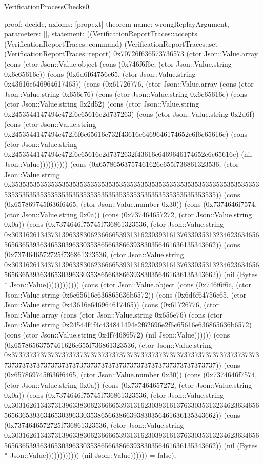 \begin{lexlean}{VerificationProcessChecks0}
\begin{semanticmodule}
{  proof: decide{},
  axioms: [propext]
}
theorem{
  name: wrongReplayArgument,
  parameters: [],
  statement: ((VerificationReportTraces::accepts (VerificationReportTraces::command) (VerificationReportTraces::set (VerificationReportTraces::report) 0x70726f636573736573 (ctor Json::Value.array (cons (ctor Json::Value.object (cons (0x746f6f6c, (ctor Json::Value.string 0x6c65616e)) (cons (0x6d6f64756c65, (ctor Json::Value.string 0x43616e646964617465)) (cons (0x61726776, (ctor Json::Value.array (cons (ctor Json::Value.string 0x656e76) (cons (ctor Json::Value.string 0x6c65616e) (cons (ctor Json::Value.string 0x2d52) (cons (ctor Json::Value.string 0x2453544147494e472f6c65616e2d737263) (cons (ctor Json::Value.string 0x2d6f) (cons (ctor Json::Value.string 0x2453544147494e472f6f6c65616e732f43616e6469646174652e6f6c65616e) (cons (ctor Json::Value.string 0x2453544147494e472f6c65616e2d7372632f43616e6469646174652e6c65616e) (nil Json::Value)))))))))) (cons (0x65786563757461626c655f736861323536, (ctor Json::Value.string 0x35353535353535353535353535353535353535353535353535353535353535353535353535353535353535353535353535353535353535353535353535353535)) (cons (0x657869745f636f6465, (ctor Json::Value.number 0x30)) (cons (0x7374646f7574, (ctor Json::Value.string 0x0a)) (cons (0x737464657272, (ctor Json::Value.string 0x0a)) (cons (0x7374646f75745f736861323536, (ctor Json::Value.string 0x30316261343731396338306236666539313162303931613763303531323462363465656563653936346530396330353865663866393830356461636135343662)) (cons (0x7374646572725f736861323536, (ctor Json::Value.string 0x30316261343731396338306236666539313162303931613763303531323462363465656563653936346530396330353865663866393830356461636135343662)) (nil (Bytes * Json::Value)))))))))))) (cons (ctor Json::Value.object (cons (0x746f6f6c, (ctor Json::Value.string 0x6c65616e636865636b6572)) (cons (0x6d6f64756c65, (ctor Json::Value.string 0x43616e646964617465)) (cons (0x61726776, (ctor Json::Value.array (cons (ctor Json::Value.string 0x656e76) (cons (ctor Json::Value.string 0x24544f4f4c434841494e2f62696e2f6c65616e636865636b6572) (cons (ctor Json::Value.string 0x4f74686572) (nil Json::Value)))))) (cons (0x65786563757461626c655f736861323536, (ctor Json::Value.string 0x37373737373737373737373737373737373737373737373737373737373737373737373737373737373737373737373737373737373737373737373737373737)) (cons (0x657869745f636f6465, (ctor Json::Value.number 0x30)) (cons (0x7374646f7574, (ctor Json::Value.string 0x0a)) (cons (0x737464657272, (ctor Json::Value.string 0x0a)) (cons (0x7374646f75745f736861323536, (ctor Json::Value.string 0x30316261343731396338306236666539313162303931613763303531323462363465656563653936346530396330353865663866393830356461636135343662)) (cons (0x7374646572725f736861323536, (ctor Json::Value.string 0x30316261343731396338306236666539313162303931613763303531323462363465656563653936346530396330353865663866393830356461636135343662)) (nil (Bytes * Json::Value)))))))))))) (nil Json::Value)))))) = false),
}
\end{semanticmodule}
\end{lexlean}
